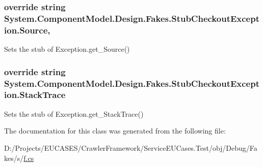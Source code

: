 \hypertarget{class_system_1_1_component_model_1_1_design_1_1_fakes_1_1_stub_checkout_exception_a2a5a22faaf27912906365c56c00705d6}{
\subsubsection[{Source}]{\setlength{\rightskip}{0pt plus 5cm}override string System.\-Component\-Model.\-Design.\-Fakes.\-Stub\-Checkout\-Exception.\-Source\hspace{0.3cm}{\ttfamily [get]}, {\ttfamily [set]}}}\label{class_system_1_1_component_model_1_1_design_1_1_fakes_1_1_stub_checkout_exception_a2a5a22faaf27912906365c56c00705d6}


Sets the stub of Exception.\-get\-\_\-\-Source()

\hypertarget{class_system_1_1_component_model_1_1_design_1_1_fakes_1_1_stub_checkout_exception_ae3e221c4f122e586cff5f80c393a526a}{
\subsubsection[{Stack\-Trace}]{\setlength{\rightskip}{0pt plus 5cm}override string System.\-Component\-Model.\-Design.\-Fakes.\-Stub\-Checkout\-Exception.\-Stack\-Trace\hspace{0.3cm}{\ttfamily [get]}}}\label{class_system_1_1_component_model_1_1_design_1_1_fakes_1_1_stub_checkout_exception_ae3e221c4f122e586cff5f80c393a526a}


Sets the stub of Exception.\-get\-\_\-\-Stack\-Trace()



The documentation for this class was generated from the following file\-:\begin{DoxyCompactItemize}
\item 
D\-:/\-Projects/\-E\-U\-C\-A\-S\-E\-S/\-Crawler\-Framework/\-Service\-E\-U\-Cases.\-Test/obj/\-Debug/\-Fakes/s/\hyperlink{s_2f_8cs}{f.\-cs}\end{DoxyCompactItemize}
